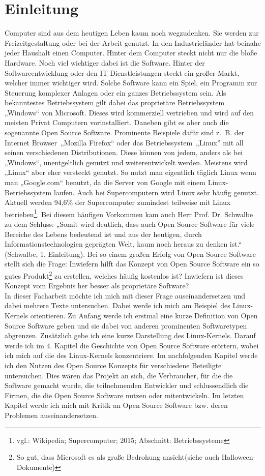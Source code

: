 \documentclass[a4paper,12pt]{article}
\begin{document}
\section{Einleitung}
Computer sind aus dem heutigen Leben kaum noch wegzudenken. Sie werden zur Freizeitgestaltung oder bei der Arbeit genutzt. In den Industrieländer hat beinahe jeder Haushalt einen Computer. Hinter dem Computer steckt nicht nur die bloße Hardware. Noch viel wichtiger dabei ist die Software. Hinter der Softwareentwicklung oder den IT-Dienstleistungen steckt ein großer Markt, welcher immer wichtiger wird. Solche Software kann ein Spiel, ein Programm zur Steuerung komplexer Anlagen oder ein ganzes Betriebssystem sein. Als bekanntestes Betriebssystem gilt dabei das proprietäre Betriebssystem „Windows“ von Microsoft. Dieses wird kommerziell vertrieben und wird auf den meisten Privat Computern vorinstalliert. Daneben gibt es aber auch die sogenannte Open Source Software. Prominente Beispiele dafür sind z.~B. der Internet Browser~„Mozilla Firefox“ oder das Betriebssystem~„Linux” mit all seinen verschiedenen Distributionen. Diese können von jedem, anders als bei „Windows“, unentgeltlich genutzt und weiterentwickelt werden. Meistens wird „Linux“ aber eher versteckt genutzt. So nutzt man eigentlich täglich Linux wenn man „Google.com“ benutzt, da die Server von Google mit einem Linux-Betriebssystem laufen. Auch bei Supercomputern wird Linux sehr häufig genutzt. Aktuell werden 94,6\% der Supercomputer zumindest teilweise mit Linux betrieben\footnote{vgl.: Wikipedia; Supercomputer; 2015; Abschnitt: Betriebssysteme}. Bei diesem häufigen Vorkommen kam auch Herr Prof. Dr. Schwalbe zu dem Schluss: „Somit wird deutlich, dass auch Open Source Software für viele Bereiche des Lebens bedeutend ist und aus der heutigen, durch Informationstechnologien geprägten Welt, kaum noch heraus zu denken ist.“ (Schwalbe, 1. Einleitung). Bei so einem großen Erfolg von Open Source Software stellt sich die Frage: Inwiefern hilft das Konzept von Open Source Software ein so gutes Produkt\footnote{So gut, dass Microsoft es als große Bedrohung ansieht(siehe auch Halloween-Dokumente)} zu erstellen, welches häufig kostenlos ist? Inwiefern ist dieses Konzept vom Ergebnis her besser als proprietäre Software?\\
In dieser Facharbeit möchte ich mich mit dieser Frage auseinandersetzen und dabei mehrere Texte untersuchen. Dabei werde ich mich am Beispiel des Linux-Kernels orientieren. Zu Anfang werde ich erstmal eine kurze Definition von Open Source Software geben und sie dabei von anderen prominenten Softwaretypen abgrenzen. Zusätzlich gebe ich eine kurze Darstellung des Linux-Kernels. Darauf werde ich im 4. Kapitel die Geschichte von Open Source Software erörtern, wobei ich mich auf die des Linux-Kernels konzentriere. Im nachfolgenden Kapitel werde ich den Nutzen des Open Source Konzepts für verschiedene Beteiligte untersuchen. Dies wären das Projekt an sich, die Verbraucher, für die die Software gemacht wurde, die teilnehmenden Entwickler und schlussendlich die Firmen, die die Open Source Software nutzen oder mitentwickeln. Im letzten Kapitel werde ich mich mit Kritik an Open Source Software bzw. deren Problemen auseinandersetzen.
\end{document}
